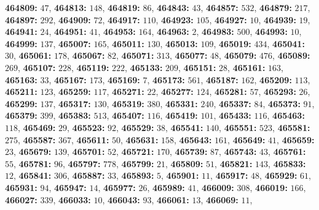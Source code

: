 \textsf{\bfseries 464809:} $47$, \textsf{\bfseries 464813:} $148$, \textsf{\bfseries 464819:} $86$, \textsf{\bfseries 464843:} $43$, \textsf{\bfseries 464857:} $532$, \textsf{\bfseries 464879:} $217$, \textsf{\bfseries 464897:} $292$, \textsf{\bfseries 464909:} $72$, \textsf{\bfseries 464917:} $110$, \textsf{\bfseries 464923:} $105$, \textsf{\bfseries 464927:} $10$, \textsf{\bfseries 464939:} $19$, \textsf{\bfseries 464941:} $24$, \textsf{\bfseries 464951:} $41$, \textsf{\bfseries 464953:} $164$, \textsf{\bfseries 464963:} $2$, \textsf{\bfseries 464983:} $500$, \textsf{\bfseries 464993:} $10$, \textsf{\bfseries 464999:} $137$, \textsf{\bfseries 465007:} $165$, \textsf{\bfseries 465011:} $130$, \textsf{\bfseries 465013:} $109$, \textsf{\bfseries 465019:} $434$, \textsf{\bfseries 465041:} $30$, \textsf{\bfseries 465061:} $178$, \textsf{\bfseries 465067:} $82$, \textsf{\bfseries 465071:} $313$, \textsf{\bfseries 465077:} $48$, \textsf{\bfseries 465079:} $476$, \textsf{\bfseries 465089:} $269$, \textsf{\bfseries 465107:} $228$, \textsf{\bfseries 465119:} $222$, \textsf{\bfseries 465133:} $209$, \textsf{\bfseries 465151:} $28$, \textsf{\bfseries 465161:} $163$, \textsf{\bfseries 465163:} $33$, \textsf{\bfseries 465167:} $173$, \textsf{\bfseries 465169:} $7$, \textsf{\bfseries 465173:} $561$, \textsf{\bfseries 465187:} $162$, \textsf{\bfseries 465209:} $113$, \textsf{\bfseries 465211:} $123$, \textsf{\bfseries 465259:} $117$, \textsf{\bfseries 465271:} $22$, \textsf{\bfseries 465277:} $124$, \textsf{\bfseries 465281:} $57$, \textsf{\bfseries 465293:} $26$, \textsf{\bfseries 465299:} $137$, \textsf{\bfseries 465317:} $130$, \textsf{\bfseries 465319:} $380$, \textsf{\bfseries 465331:} $240$, \textsf{\bfseries 465337:} $84$, \textsf{\bfseries 465373:} $91$, \textsf{\bfseries 465379:} $399$, \textsf{\bfseries 465383:} $513$, \textsf{\bfseries 465407:} $116$, \textsf{\bfseries 465419:} $101$, \textsf{\bfseries 465433:} $116$, \textsf{\bfseries 465463:} $118$, \textsf{\bfseries 465469:} $29$, \textsf{\bfseries 465523:} $92$, \textsf{\bfseries 465529:} $38$, \textsf{\bfseries 465541:} $140$, \textsf{\bfseries 465551:} $523$, \textsf{\bfseries 465581:} $275$, \textsf{\bfseries 465587:} $367$, \textsf{\bfseries 465611:} $50$, \textsf{\bfseries 465631:} $158$, \textsf{\bfseries 465643:} $161$, \textsf{\bfseries 465649:} $41$, \textsf{\bfseries 465659:} $23$, \textsf{\bfseries 465679:} $139$, \textsf{\bfseries 465701:} $52$, \textsf{\bfseries 465721:} $170$, \textsf{\bfseries 465739:} $87$, \textsf{\bfseries 465743:} $43$, \textsf{\bfseries 465761:} $55$, \textsf{\bfseries 465781:} $96$, \textsf{\bfseries 465797:} $778$, \textsf{\bfseries 465799:} $21$, \textsf{\bfseries 465809:} $51$, \textsf{\bfseries 465821:} $143$, \textsf{\bfseries 465833:} $12$, \textsf{\bfseries 465841:} $306$, \textsf{\bfseries 465887:} $33$, \textsf{\bfseries 465893:} $5$, \textsf{\bfseries 465901:} $11$, \textsf{\bfseries 465917:} $48$, \textsf{\bfseries 465929:} $61$, \textsf{\bfseries 465931:} $94$, \textsf{\bfseries 465947:} $14$, \textsf{\bfseries 465977:} $26$, \textsf{\bfseries 465989:} $41$, \textsf{\bfseries 466009:} $308$, \textsf{\bfseries 466019:} $166$, \textsf{\bfseries 466027:} $339$, \textsf{\bfseries 466033:} $10$, \textsf{\bfseries 466043:} $93$, \textsf{\bfseries 466061:} $13$, \textsf{\bfseries 466069:} $11$, 
